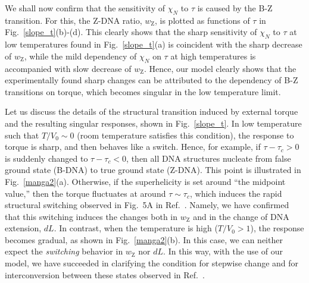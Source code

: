 \documentclass[pre,showpacs,twocolumn,superscriptaddress]{revtex4}
\begin{document}
We shall now confirm that
the sensitivity of $\chi_N$ to $\tau$ is caused by the B-Z transition.
For this, the Z-DNA ratio, $w_\text{Z}$, is plotted 
as functions of $\tau$ in Fig.~\ref{slope_t}(b)-(d).
This clearly
shows that
the sharp sensitivity of $\chi_N$ to $\tau$ at low temperatures 
found in Fig.~\ref{slope_t}(a) is coincident with
the sharp decrease of $w_\text{Z}$,
while
the mild dependency of $\chi_N$ on $\tau$ at high temperatures 
is accompanied with slow decrease of $w_\text{Z}$.
Hence,
our model clearly shows that
the experimentally found sharp changes can be attributed to
the dependency of B-Z transitions on torque,  
which becomes singular in the low temperature limit.


Let us discuss 
the details of
the structural transition induced by external torque
and the resulting singular responses, shown in Fig.~\ref{slope_t}.
In low temperature such that $T/V_0 \sim 0$ 
(room temperature satisfies this condition), 
the response to torque  is sharp, and then behaves like a switch.
Hence, for example, 
if $\tau-\tau_c>0$ is suddenly changed to $\tau-\tau_c<0$, 
then
all DNA structures nucleate from false ground state (B-DNA) 
to true ground state (Z-DNA).
This point is illustrated in Fig.~\ref{manga2}(a).
Otherwise,
if the superhelicity is set around ``the midpoint value,''
then the torque fluctuates at around $\tau \sim \tau_c$,
which induces
the rapid structural switching observed in Fig.~5A in Ref.~\cite{BZtrans}.
Namely, we have confirmed that 
this switching induces the changes both in $w_\text{Z}$ and in 
the change of 
DNA extension, $dL$.
In contrast, when the temperature is high ($T/V_0>1$),
the response becomes gradual, as shown in Fig.~\ref{manga2}(b).
In this case,
we can neither expect the {\em switching} behavior  in $w_\text{Z}$ nor $dL$.
In this way, with the use of our model,
we have succeeded in clarifying
the condition for stepwise change 
and for interconversion between these states
observed in Ref.~\cite{BZtrans}.
\end{document}
